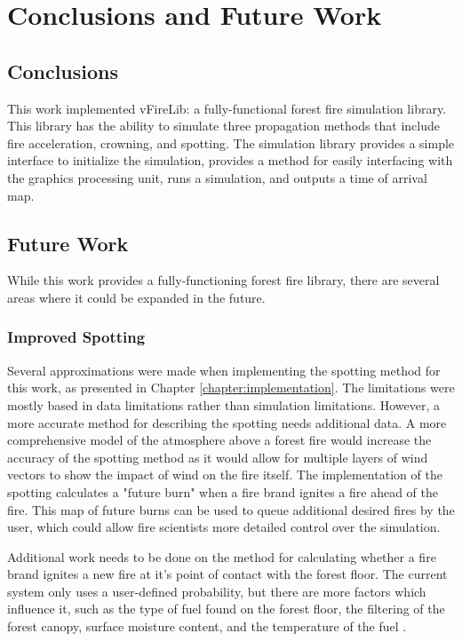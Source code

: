 \chapter{Conclusions and Future Work}
\label{chapter:conclusions}

\section{Conclusions}
This work implemented vFireLib: a fully-functional forest fire simulation library. This library has the ability to simulate three propagation methods that include fire acceleration, crowning, and spotting. The simulation library provides a simple interface to initialize the simulation, provides a method for easily interfacing with the graphics processing unit, runs a simulation, and outputs a time of arrival map. 

\section{Future Work}
While this work provides a fully-functioning forest fire library, there are several areas where it could be expanded in the future. 

\subsection{Improved Spotting} 
Several approximations were made when implementing the spotting method for this work, as presented in Chapter \ref{chapter:implementation}. The limitations were mostly based in data limitations rather than simulation limitations. However, a more accurate method for describing the spotting needs additional data. A more comprehensive model of the atmosphere above a forest fire would increase the accuracy of the spotting method as it would allow for multiple layers of wind vectors to show the impact of wind on the fire itself. The implementation of the spotting calculates a "future burn" when a fire brand ignites a fire ahead of the fire. This map of future burns can be used to queue additional desired fires by the user, which could allow fire scientists more detailed control over the simulation. 

Additional work needs to be done on the method for calculating whether a fire brand ignites a new fire at it's point of contact with the forest floor. The current system only uses a user-defined probability, but there are more factors which influence it, such as the type of fuel found on the forest floor, the filtering of the forest canopy, surface moisture content, and the temperature of the fuel \cite{bradshaw1984}\cite{blackmarr1972}\cite{bunting1974}.

